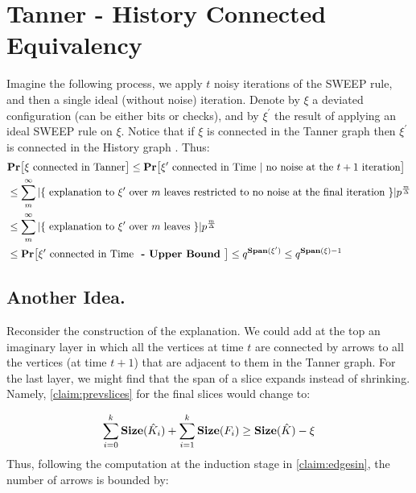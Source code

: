 
\section{Tanner - History Connected Equivalency}
Imagine the following process, we apply $t$ noisy iterations of the SWEEP rule, and then a single ideal (without noise) iteration. Denote by $\xi$ a deviated configuration (can be either bits or checks), and by $\xi^{\prime}$ the result of applying an ideal SWEEP rule on $\xi$. Notice that if $\xi$ is connected in the Tanner graph then $\xi^{\prime}$ is connected in the History graph . Thus:
\begin{equation*}
  \begin{split}
    & \mathbf{Pr} \big[ \xi \text{ connected in Tanner} \big]  \le \mathbf{Pr} \big[ \xi^{\prime} \text{ connected in Time } | \text{ no noise at the } t+1 \text{ iteration}   \big]\\
    & \le \sum^{\infty}_{m} | \{ \text{ explanation to } \xi^{\prime} \text{ over } m \text{ leaves restricted to no noise at the final iteration } \} | p^{\frac{m}{\Delta}} \\ 
    & \le \sum^{\infty}_{m} | \{ \text{ explanation to } \xi^{\prime} \text{ over } m \text{ leaves } \} | p^{\frac{m}{\Delta}} \\ 
    & \le \mathbf{Pr} \big[ \xi^{\prime} \text{ connected in Time } \textbf{ - Upper Bound }   \big] \le q^{\mathbf{Span}(\xi^{\prime})} \le q^{\mathbf{Span}(\xi) - 1 }
  \end{split}
\end{equation*}

\subsection{Another Idea.}
Reconsider the construction of the explanation. We could add at the top an imaginary layer in which all the vertices at time $t$ are connected by arrows to all the vertices (at time $t+1$) that are adjacent to them in the Tanner graph. For the last layer, we might find that the span of a slice expands instead of shrinking. Namely, \cref{claim:prevslices} for the final slices would change to:

\begin{equation*}
  \begin{split}
\sum_{i=0}^{k}\mathbf{Size}(\hat{K}_{i}) +  \sum^{k}_{i=1}\mathbf{Size}(F_{i}) \ge \mathbf{Size}(\hat{K}) - \xi 
  \end{split}
\end{equation*}
Thus, following the computation at the induction stage in \cref{claim:edgesin}, the number of arrows is bounded by:

